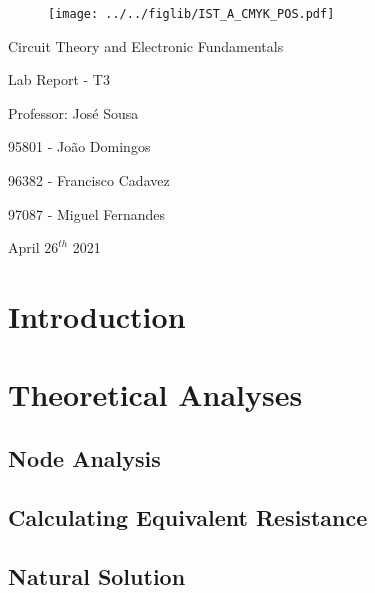\documentclass[11pt]{article}
\begin{document}
\thispagestyle{empty}
\begin{figure}[h]
	\centering
	\texttt{[image: ../../figlib/IST\_A\_CMYK\_POS.pdf]}
\end{figure}

\begin{center}
	\huge{Circuit Theory and Electronic Fundamentals}
	
	\huge{Lab Report - T3}
	
	\vspace{30pt}
	
	\large{Professor: José Sousa}
	
	\vspace{20pt}
	
	\large{95801 - João Domingos}
	
	\large{96382 - Francisco Cadavez}
	
	\large{97087 - Miguel Fernandes}
	
	\vspace{20pt}
	
	\large{April $26^{th}$ 2021}
\end{center}

\pagebreak
\tableofcontents

\pagebreak
\section{Introduction}
%

\pagebreak
\section{Theoretical Analyses}
\label{sec:theory}

\subsection{Node Analysis}

%

\newpage

\subsection{Calculating Equivalent Resistance}

%

\newpage

\subsection{Natural Solution}
\end{document}
